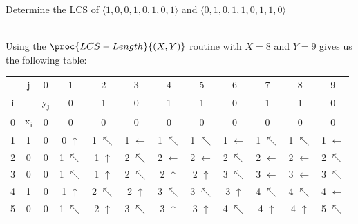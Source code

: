 \documentclass[addpoints,11pt]{exam}
\begin{document}
\begin{questions}
		\question[5]
		Determine the LCS of $\langle 1, 0, 0, 1, 0, 1, 0, 1 \rangle$ and $\langle 0, 1, 0, 1, 1, 0, 1, 1, 0 \rangle$
		\begin{solutionorbox} \\
			Using the $\proc{LCS-Length}{(X,Y)}$ routine with $X = 8$ and $Y = 9$ gives us the following table: \\
			\begin{tabular}{c c | c | c | c | c | c | c | c | c | c | c |}
				\multicolumn{1}{c}{\null} & \multicolumn{1}{c}{j} &
				\multicolumn{1}{c}{0} &
				\multicolumn{1}{c}{1} &
				\multicolumn{1}{c}{2} &
				\multicolumn{1}{c}{3} &
				\multicolumn{1}{c}{4} &
				\multicolumn{1}{c}{5} &
				\multicolumn{1}{c}{6} &
				\multicolumn{1}{c}{7} &
				\multicolumn{1}{c}{8} &
				\multicolumn{1}{c}{9}\\
				\multirow{1}{*}{i} & 
				\multicolumn{1}{c}{\null} &
				\multicolumn{1}{c}{y\textsubscript{j}} &
				\multicolumn{1}{c}{0} &
				\multicolumn{1}{c}{1} &
				\multicolumn{1}{c}{0} &
				\multicolumn{1}{c}{1} &
				\multicolumn{1}{c}{1} &
				\multicolumn{1}{c}{0} &
				\multicolumn{1}{c}{1} &
				\multicolumn{1}{c}{1} &
				\multicolumn{1}{c}{0}\\    
				\cline{3-12}
				\multirow{1}{*}{0} &
				x\textsubscript{i} & 0 & 0 & 0 & 0 & 0 & 0 & 0 & 0 & 0 & 0\\\cline{3-12}
				\multirow{1}{*}{1} &
				1 & 0 & 0 $\uparrow$ & 1 $\nwarrow$ & 1 $\leftarrow$ & 1 $\nwarrow$ & 1 $\nwarrow$ & 1 $\leftarrow$ & 1 $\nwarrow$ & 1 $\nwarrow$ & 1 $\leftarrow$\\\cline{3-12}
				\multirow{1}{*}{2} &
				0 & 0 & 1 $\nwarrow$ & 1 $\uparrow$ & 2 $\nwarrow$ & 2 $\leftarrow$ & 2 $\leftarrow$ & 2 $\nwarrow$ & 2 $\leftarrow$ & 2 $\leftarrow$ & 2 $\nwarrow$\\\cline{3-12}
				\multirow{1}{*}{3} &
				0 & 0 & 1 $\nwarrow$ & 1 $\uparrow$ & 2 $\nwarrow$ & 2 $\uparrow$ & 2 $\uparrow$ & 3 $\nwarrow$ & 3 $\leftarrow$ & 3 $\leftarrow$ & 3 $\nwarrow$\\\cline{3-12}
				\multirow{1}{*}{4} &
				1 & 0 & 1 $\uparrow$ & 2 $\nwarrow$ & 2 $\uparrow$ & 3 $\nwarrow$ & 3 $\nwarrow$ & 3 $\uparrow$ & 4 $\nwarrow$ & 4 $\nwarrow$ & 4 $\leftarrow$\\\cline{3-12}
				\multirow{1}{*}{5} &
				0 & 0 & 1 $\nwarrow$ & 2 $\uparrow$ & 3 $\nwarrow$ & 3 $\uparrow$ & 3 $\uparrow$ & 4 $\nwarrow$ & 4 $\uparrow$ & 4 $\uparrow$ & 5 $\nwarrow$\\\cline{3-12}

\end{tabular}
\end{solutionorbox}
\end{questions}
\end{document}
